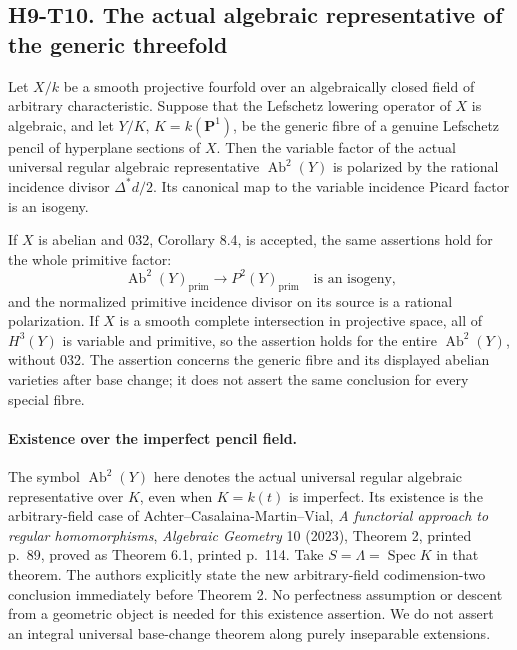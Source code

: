 
\subsection*{H9-T10. The actual algebraic representative of the generic threefold}

\begin{theorem}[H9-T10]
Let $X/k$ be a smooth projective fourfold over an algebraically closed
field of arbitrary characteristic. Suppose that the Lefschetz lowering
operator of $X$ is algebraic, and let $Y/K$, $K=k(\mathbf P^1)$, be the
generic fibre of a genuine Lefschetz pencil of hyperplane sections of
$X$. Then the variable factor of the actual universal regular algebraic
representative $\operatorname{Ab}^2(Y)$ is polarized by the rational
incidence divisor $\Delta^*d/2$. Its canonical map to the variable
incidence Picard factor is an isogeny.

If $X$ is abelian and 032, Corollary 8.4, is accepted, the same assertions
hold for the whole primitive factor:
\[
 \operatorname{Ab}^2(Y)_{\mathrm{prim}}
          \longrightarrow P^2(Y)_{\mathrm{prim}}
       \quad\text{is an isogeny,}                           \tag{H9.32}
\]
and the normalized primitive incidence divisor on its source is a
rational polarization. If $X$ is a smooth complete intersection in
projective space, all of $H^3(Y)$ is variable and primitive, so the
assertion holds for the entire $\operatorname{Ab}^2(Y)$, without 032.
The assertion concerns the generic fibre and its displayed abelian
varieties after base change; it does not assert the same conclusion
for every special fibre.
\end{theorem}

\paragraph{Existence over the imperfect pencil field.}
The symbol $\operatorname{Ab}^2(Y)$ here denotes the actual universal
regular algebraic representative over $K$, even when $K=k(t)$ is
imperfect. Its existence is the arbitrary-field case of
Achter--Casalaina-Martin--Vial, \emph{A functorial approach to regular
homomorphisms}, \emph{Algebraic Geometry} 10 (2023), Theorem 2,
printed p.~89, proved as Theorem 6.1, printed p.~114. Take
$S=\Lambda=\operatorname{Spec}K$ in that theorem. The authors explicitly
state the new arbitrary-field codimension-two conclusion immediately
before Theorem 2. No perfectness assumption or descent from a geometric
object is needed for this existence assertion. We do not assert an
integral universal base-change theorem along purely inseparable
extensions.

